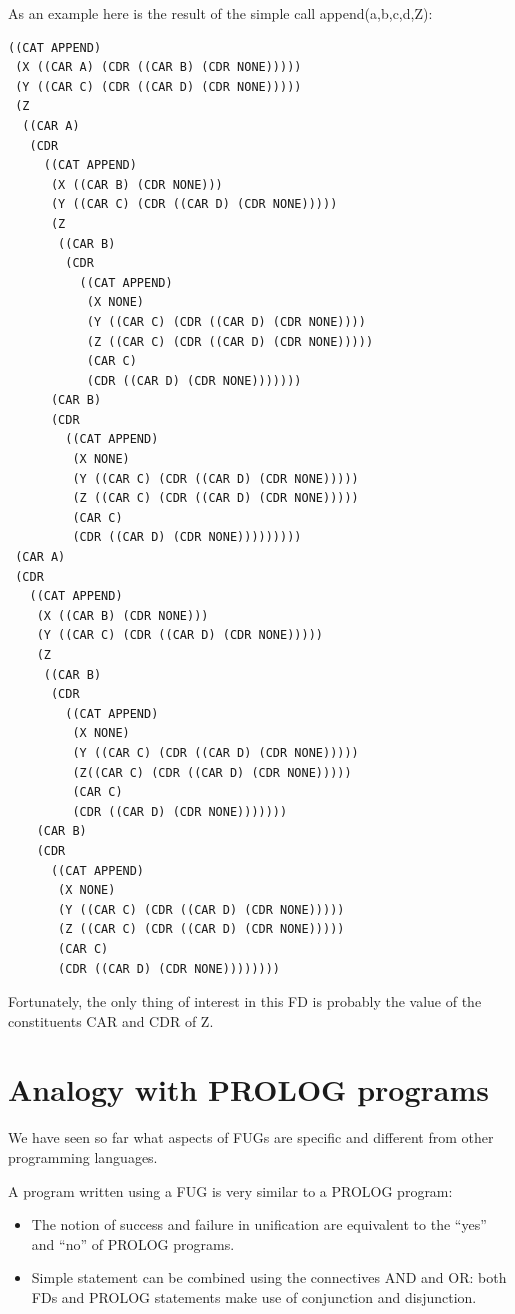 \documentclass[10pt,a4paper]{report}
\begin{document}
\begin{appendices}
As an example here is the result of the simple call
append({a,b},{c,d},Z):

\begin{lstlisting}[language=Lisp]
((CAT APPEND)
 (X ((CAR A) (CDR ((CAR B) (CDR NONE)))))
 (Y ((CAR C) (CDR ((CAR D) (CDR NONE)))))
 (Z
  ((CAR A)
   (CDR
     ((CAT APPEND)
      (X ((CAR B) (CDR NONE)))
      (Y ((CAR C) (CDR ((CAR D) (CDR NONE)))))
      (Z
       ((CAR B)
        (CDR
          ((CAT APPEND)
           (X NONE)
           (Y ((CAR C) (CDR ((CAR D) (CDR NONE))))
           (Z ((CAR C) (CDR ((CAR D) (CDR NONE)))))
           (CAR C)
           (CDR ((CAR D) (CDR NONE)))))))
      (CAR B)
      (CDR
        ((CAT APPEND)
         (X NONE)
         (Y ((CAR C) (CDR ((CAR D) (CDR NONE)))))
         (Z ((CAR C) (CDR ((CAR D) (CDR NONE)))))
         (CAR C)
         (CDR ((CAR D) (CDR NONE)))))))))
 (CAR A)
 (CDR
   ((CAT APPEND)
    (X ((CAR B) (CDR NONE)))
    (Y ((CAR C) (CDR ((CAR D) (CDR NONE)))))
    (Z
     ((CAR B)
      (CDR
        ((CAT APPEND)
         (X NONE)
         (Y ((CAR C) (CDR ((CAR D) (CDR NONE)))))
         (Z((CAR C) (CDR ((CAR D) (CDR NONE)))))
         (CAR C)
         (CDR ((CAR D) (CDR NONE)))))))
    (CAR B)
    (CDR
      ((CAT APPEND)
       (X NONE)
       (Y ((CAR C) (CDR ((CAR D) (CDR NONE)))))
       (Z ((CAR C) (CDR ((CAR D) (CDR NONE)))))
       (CAR C)
       (CDR ((CAR D) (CDR NONE))))))))
\end{lstlisting}

Fortunately, the only thing of interest in this FD is probably
the value of the constituents CAR and CDR of Z.


\section{Analogy with PROLOG programs}

We have seen so far what aspects of FUGs are specific and
different from other programming languages.

A program written using a FUG is very similar to a PROLOG
program:
\begin{itemize}
\item The notion of success and failure in unification are equivalent
to the ``yes'' and ``no'' of PROLOG programs.

\item Simple statement can be combined using the connectives AND and
OR: both FDs and PROLOG statements make use of conjunction and
disjunction. 


\end{itemize}
\end{appendices}
\end{document}
